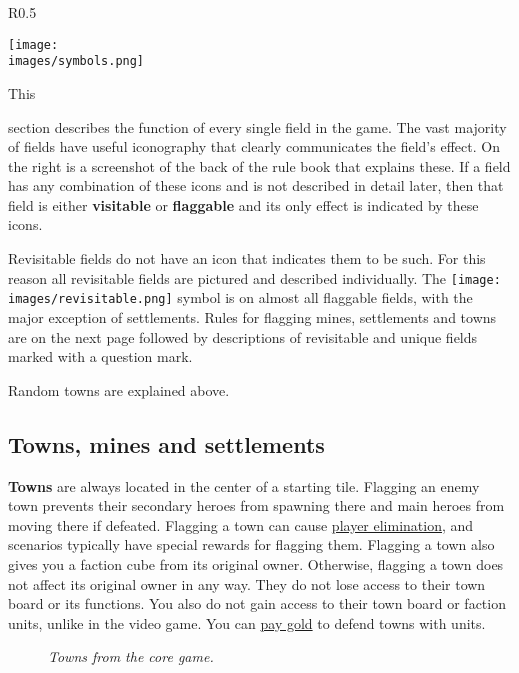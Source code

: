 \begin{wrapfigure}{R}{0.5\textwidth}
    \begin{center}
    \texttt{[image: \\images/symbols.png]}
    \end{center}
\end{wrapfigure}
\hypertarget{All}{This} section describes the function of every single field in the game.
The vast majority of fields have useful iconography that clearly communicates the field's effect.
On the right is a screenshot of the back of the rule book that explains these.
If a field has any combination of these icons and is not described in detail later, then that field is either \textbf{visitable} or \textbf{flaggable} and its only effect is indicated by these icons.\par
Revisitable fields do not have an icon that indicates them to be such.
For this reason all revisitable fields are pictured and described individually.
The \texttt{[image: \\images/revisitable.png]} symbol is on almost all flaggable fields, with the major exception of settlements.
Rules for flagging mines, settlements and towns are on the next page followed by descriptions of revisitable and unique fields marked with a question mark.\par
Random towns are explained above.

\clearpage
\subsection*{Towns, mines and settlements}
\textbf{Towns} are always located in the center of a starting tile.
Flagging an enemy town prevents their secondary heroes from spawning there and main heroes from moving there if defeated.
Flagging a town can cause \hyperlink{End}{player elimination}, and scenarios typically have special rewards for flagging them.
Flagging a town also gives you a faction cube from its original owner.
Otherwise, flagging a town does not affect its original owner in any way.
They do not lose access to their town board or its functions.
You also do not gain access to their town board or faction units, unlike in the video game.
You can \hyperlink{Town}{pay gold} to defend towns with units.\\
\begin{figure}[h]
\centering
{}
\caption{\textit{Towns from the core game.}}
\end{figure}

